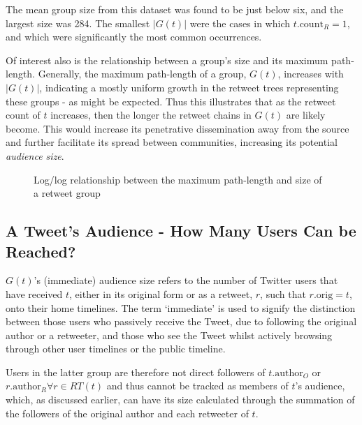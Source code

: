 The mean group size from this dataset was found to be just below six, and the largest size was 284. The smallest $|G(t)|$ were the cases in which $t.\textrm{count}_R = 1$, and which were significantly the most common occurrences.

Of interest also is the relationship between a group's size and its maximum path-length. Generally, the maximum path-length of a group, $G(t)$, increases with $|G(t)|$, indicating a mostly uniform growth in the retweet trees representing these groups - as might be expected. Thus this illustrates that as the retweet count of $t$ increases, then the longer the retweet chains in $G(t)$ are likely become. This would increase its penetrative dissemination away from the source and further facilitate its spread between communities, increasing its potential \textit{audience size}.

\begin{figure}[h]
\centering
    \caption{Log/log relationship between the maximum path-length and size of a retweet group}
\label{fig:totalretweets-pathlength}
\end{figure}

\subsection{A Tweet's Audience - How Many Users Can be Reached?}
$G(t)$'s (immediate) audience size refers to the number of Twitter users that have received $t$, either in its original form or as a retweet, $r$, such that $r.\textrm{orig} = t$, onto their home timelines. The term `immediate' is used to signify the distinction between those users who passively receive the Tweet, due to following the original author or a retweeter, and those who see the Tweet whilst actively browsing through other user timelines or the public timeline.

Users in the latter group are therefore not direct followers of $t.\textrm{author}_O$ or $r.\textrm{author}_R \forall r \in RT(t)$ and thus cannot be tracked as members of $t$'s audience, which, as discussed earlier, can have its size calculated through the summation of the followers of the original author and each retweeter of $t$.

